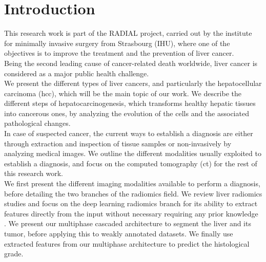 \chapter{Introduction}

This research work is part of the RADIAL project, carried out by the
institute for minimally invasive surgery from Strasbourg (IHU), where
one of the objectives is to improve the treatment and the prevention of
liver cancer.\\
Being the second leading cause of cancer-related death worldwide, liver
cancer is considered as a major public health challenge.\\
We present the different types of liver cancers, and particularly the
hepatocellular carcinoma (\ac{hcc}), which will be the main topic of our work.
We describe the different steps of hepatocarcinogenesis, which
transforms healthy hepatic tissues into cancerous ones, by analyzing the
evolution of the cells and the associated pathological changes.\\
In case of suspected cancer, the current ways to establish a diagnosis 
are either through extraction and inspection of tissue samples or 
non-invasively by analyzing medical images. 
We outline the different modalities usually exploited to establish a
diagnosis, and focus on the computed tomography (\ac{ct}) for the rest of this
research work.\\
We first present the different imaging modalities available to perform a
diagnosis, before detailing the two branches of the radiomics field. We
review liver radiomics studies and focus on the deep learning radiomics
branch for its ability to extract features directly from the input without 
necessary requiring any prior knowledge . We present our multiphase 
cascaded architecture to segment the liver and
its tumor, before applying this to weakly annotated datasets. We finally
use extracted features from our multiphase architecture to predict the
histological grade.\\

